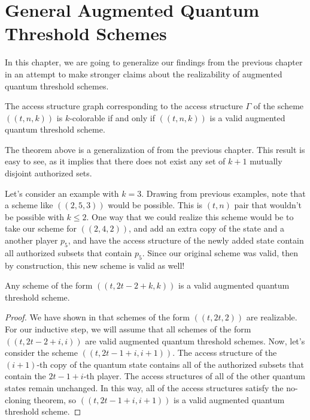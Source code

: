 \chapter{General Augmented Quantum Threshold Schemes}
\label{ch4}

In this chapter, we are going to generalize our findings from the previous chapter in an attempt to make stronger claims about the realizability of augmented quantum threshold schemes.

\begin{theorem}
    \label{thm:k-color-access}
    The access structure graph corresponding to the access structure $\Gamma$ of the scheme $((t,n,k))$ is $k$-colorable if and only if $((t,n,k))$ is a valid augmented quantum threshold scheme.
\end{theorem}

The theorem above is a generalization of  from the previous chapter. This result is easy to see, as it implies that there does not exist any set of $k+1$ mutually disjoint authorized sets.

Let's consider an example with $k=3$. Drawing from previous examples, note that a scheme like $((2,5,3))$ would be possible. This is $(t,n)$ pair that wouldn't be possible with $k \leq 2$. One way that we could realize this scheme would be to take our scheme for $((2,4,2))$, and add an extra copy of the state and a another player $p_5$, and have the access structure of the newly added state contain all authorized subsets that contain $p_5$. Since our original scheme was valid, then by construction, this new scheme is valid as well! 

\begin{theorem}
    \label{thm:build-scheme} 
    Any scheme of the form $((t,2t-2+k,k))$ is a valid augmented quantum threshold scheme.
\end{theorem}

\begin{proof}
    We have shown in  that schemes of the form $((t, 2t, 2))$ are realizable. For our inductive step, we will assume that all schemes of the form $((t, 2t - 2 + i, i))$ are valid augmented quantum threshold schemes. Now, let's consider the scheme $((t, 2t-1+i, i+1))$. The access structure of the $(i+1)$-th copy of the quantum state contains all of the authorized subsets that contain the $2t-1+i$-th player. The access structures of all of the other quantum states remain unchanged. In this way, all of the access structures satisfy the no-cloning theorem, so $((t, 2t-1+i, i+1))$ is a valid augmented quantum threshold scheme.
\end{proof}

